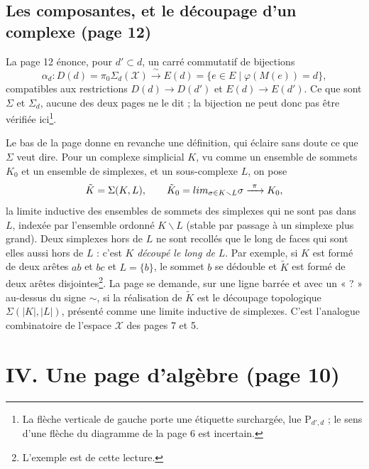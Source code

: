 \documentclass[11pt,a4paper]{article}
\begin{document}
\subsection*{Les composantes, et le découpage d'un complexe (page 12)}

La page 12 énonce, pour $d' \subset d$, un carré commutatif de bijections
\[
\alpha_d : D(d) = \pi_0 \Sigma_d(\mathcal{X}) \xrightarrow{\ \sim\ } E(d) = \{e
\in E \mid \varphi(M(e)) = d\},
\]
compatibles aux restrictions $D(d) \to D(d')$ et $E(d) \to E(d')$. Ce que sont
$\Sigma$ et $\Sigma_d$, aucune des deux pages ne le dit ; la bijection ne peut
donc pas être vérifiée ici\footnote{La flèche verticale de gauche porte une
étiquette surchargée, lue $\mathrm{P}_{d',d}$ ; le sens d'une flèche du
diagramme de la page 6 est incertain.}.

Le bas de la page donne en revanche une définition, qui éclaire sans doute ce
que $\Sigma$ veut dire. Pour un complexe simplicial $K$, vu comme un ensemble
de sommets $K_0$ et un ensemble de simplexes, et un sous-complexe $L$, on pose
\[
\tilde{K} = \Sigma(K, L), \qquad \tilde{K}_0 = \varinjlim_{\sigma \in K
\smallsetminus L} \sigma \xrightarrow{\ \pi\ } K_0 ,
\]
la limite inductive des ensembles de sommets des simplexes qui ne sont pas dans
$L$, indexée par l'ensemble ordonné $K \smallsetminus L$ (stable par passage à
un simplexe plus grand). Deux simplexes hors de $L$ ne sont recollés que le
long de faces qui sont elles aussi hors de $L$ : c'est $K$ \emph{découpé le
long de} $L$. Par exemple, si $K$ est formé de deux arêtes $ab$ et $bc$ et $L =
\{b\}$, le sommet $b$ se dédouble et $\tilde{K}$ est formé de deux arêtes
disjointes\footnote{L'exemple est de cette lecture.}. La page se demande, sur
une ligne barrée et avec un « ? » au-dessus du signe $\sim$, si la réalisation
de $\tilde{K}$ est le découpage topologique $\Sigma(|K|, |L|)$, présenté comme
une limite inductive de simplexes. C'est l'analogue combinatoire de l'espace
$\mathcal{X}$ des pages 7 et 5.

\section*{IV. Une page d'algèbre (page 10)}
\end{document}

